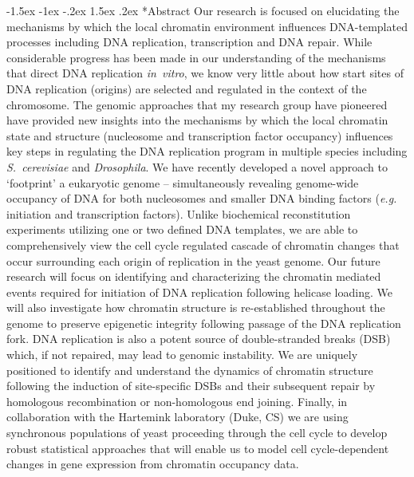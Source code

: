 \documentclass[11pt]{article}
\makeatletter
\renewcommand\section{\@startsection {section}{1}{\z@}%
{-1.5ex \@plus -1ex \@minus -.2ex}%
{1.5ex \@plus.2ex}%
{\color{dukeblue}\sffamily\Large\bfseries}}
\newcommand\dros{{\itshape Drosophila}\xspace}
\newcommand\scer{{\itshape S.~cerevisiae}\xspace}
\newcommand\invitro{{\itshape in~vitro}\xspace}
\newcommand\eg{\emph{e.g.}\xspace}
\makeatother
\begin{document}
\pagestyle{empty}
\addtolength{\itemsep}{-5mm}
\addtolength{\parskip}{1.5mm}
\addtolength{\abovecaptionskip}{-10mm}
%
%
%
\section*{Abstract}
Our research is focused on elucidating the mechanisms by which the local chromatin environment influences DNA-templated processes including DNA replication, transcription and DNA repair.  While considerable progress has been made in our understanding of the mechanisms that direct DNA replication \invitro, we know very little about how start sites of DNA replication (origins) are selected and regulated in the context of the chromosome.  The genomic approaches that my research group have pioneered have provided new insights into the mechanisms by which the local chromatin state and structure (nucleosome and transcription factor occupancy) influences key steps in regulating the DNA replication program in multiple species including \scer and \dros.  We have recently developed a novel approach to `footprint' a eukaryotic genome -- simultaneously revealing genome-wide occupancy of DNA for both nucleosomes and smaller DNA binding factors (\eg initiation and transcription factors).  Unlike biochemical reconstitution experiments utilizing one or two defined DNA templates, we are able to comprehensively view the cell cycle regulated cascade of chromatin changes that occur surrounding each origin of replication in the yeast genome.  Our future research will focus on identifying and characterizing the chromatin mediated events required for initiation of DNA replication following helicase loading.  We will also investigate how chromatin structure is re-established throughout the genome to preserve epigenetic integrity following passage of the DNA replication fork.  DNA replication is also a potent source of double-stranded breaks (DSB) which, if not repaired, may lead to genomic instability.  We are uniquely positioned to identify and understand the dynamics of chromatin structure following the induction of site-specific DSBs and their subsequent repair by homologous recombination or non-homologous end joining. Finally, in collaboration with the Hartemink laboratory (Duke, CS) we are using synchronous populations of yeast proceeding through the cell cycle to develop robust statistical approaches that will enable us to model cell cycle-dependent changes in gene expression from chromatin occupancy data. 
\end{document}
